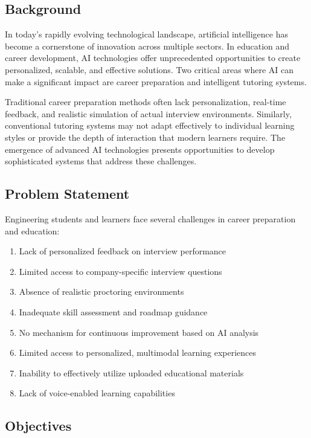 \documentclass[12pt, conference]{IEEEtran}
\begin{document}
\subsection{Background}

In today's rapidly evolving technological landscape, artificial intelligence has become a cornerstone of innovation across multiple sectors. In education and career development, AI technologies offer unprecedented opportunities to create personalized, scalable, and effective solutions. Two critical areas where AI can make a significant impact are career preparation and intelligent tutoring systems.

Traditional career preparation methods often lack personalization, real-time feedback, and realistic simulation of actual interview environments. Similarly, conventional tutoring systems may not adapt effectively to individual learning styles or provide the depth of interaction that modern learners require. The emergence of advanced AI technologies presents opportunities to develop sophisticated systems that address these challenges.

\subsection{Problem Statement}

Engineering students and learners face several challenges in career preparation and education:
\begin{enumerate}
    \item Lack of personalized feedback on interview performance
    \item Limited access to company-specific interview questions
    \item Absence of realistic proctoring environments
    \item Inadequate skill assessment and roadmap guidance
    \item No mechanism for continuous improvement based on AI analysis
    \item Limited access to personalized, multimodal learning experiences
    \item Inability to effectively utilize uploaded educational materials
    \item Lack of voice-enabled learning capabilities
\end{enumerate}

\subsection{Objectives}
\end{document}
